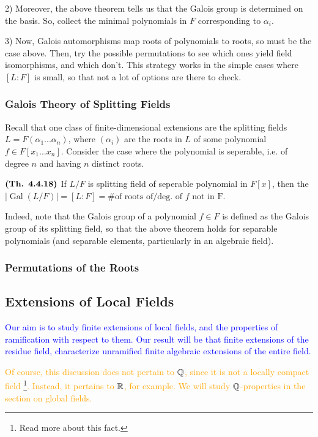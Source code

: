 \documentclass{article}
\DeclareMathOperator{\Gal}{Gal}
\begin{document}
2) Moreover, the above theorem tells us that the Galois group is determined on the basis. So, collect the minimal polynomials in $F$ corresponding to $\alpha_i$.

3) Now, Galois automorphisms map roots of polynomials to roots, so must be the case above. Then, try the possible permutations to see which ones yield field isomorphisms, and which don't. This strategy works in the simple cases where $[L:F]$ is small, so that not a lot of options are there to check.

\subsubsection*{Galois Theory of Splitting Fields}
Recall that one class of finite-dimensional extensions are the splitting fields $L=F(\alpha_1...\alpha_n)$, where $(\alpha_i)$ are the roots in $L$ of some polynomial $f \in F[x_1...x_n]$. Consider the case where the polynomial is seperable, i.e. of degree $n$ and having $n$ distinct roots.

$\textbf{(Th. 4.4.18)}$ If $L/F$ is splitting field of seperable polynomial in $F[x]$, then the $|\Gal(L/F)| = [L:F] = \text{\# of roots of/deg. of }f \text{ not in F}$. 

Indeed, note that the Galois group of a polynomial $f \in F$ is defined as the Galois group of its splitting field, so that the above theorem holds for separable polynomials (and separable elements, particularly in an algebraic field).

\subsubsection*{Permutations of the Roots}

\subsection{Extensions of Local Fields}

\textcolor{blue}{Our aim is to study finite extensions of local fields, and the properties of ramification with respect to them. Our result will be that finite extensions of the residue field, characterize unramified finite algebraic extensions of the entire field.}

\textcolor{orange}{Of course, this discussion does not pertain to $\mathbb{Q}$, since it is not a locally compact field \footnote{Read more about this fact.}. Instead, it pertains to $\mathbb{R}$, for example. We will study $\mathbb{Q}$-properties in the section on global fields.}
\end{document}
